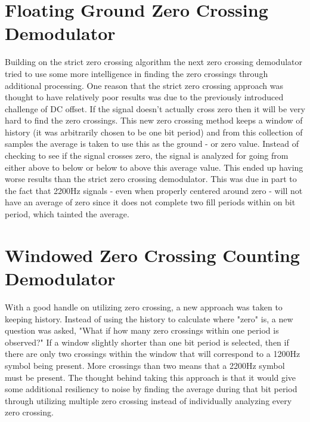 \section{Floating Ground Zero Crossing Demodulator}
Building on the strict zero crossing algorithm the next zero crossing demodulator tried to use some more intelligence in finding the zero crossings through additional processing. One reason that the strict zero crossing approach was thought to have relatively poor results was due to the previously introduced challenge of DC offset. If the signal doesn't actually cross zero then it will be very hard to find the zero crossings. This new zero crossing method keeps a window of history (it was arbitrarily chosen to be one bit period) and from this collection of samples the average is taken to use this as the ground - or zero value. Instead of checking to see if the signal crosses zero, the signal is analyzed for going from either above to below or below to above this average value. This ended up having worse results than the strict zero crossing demodulator. This was due in part to the fact that 2200Hz signals - even when properly centered around zero - will not have an average of zero since it does not complete two fill periods within on bit period, which tainted the average.

\section{Windowed Zero Crossing Counting Demodulator}
With a good handle on utilizing zero crossing, a new approach was taken to keeping history. Instead of using the history to calculate where "zero" is, a new question was asked, "What if how many zero crossings within one period is observed?" If a window slightly shorter than one bit period is selected, then if there are only two crossings within the window that will correspond to a 1200Hz symbol being present. More crossings than two means that a 2200Hz symbol must be present. The thought behind taking this approach is that it would give some additional resiliency to noise by finding the average during that bit period through utilizing multiple zero crossing instead of individually analyzing every zero crossing. 

